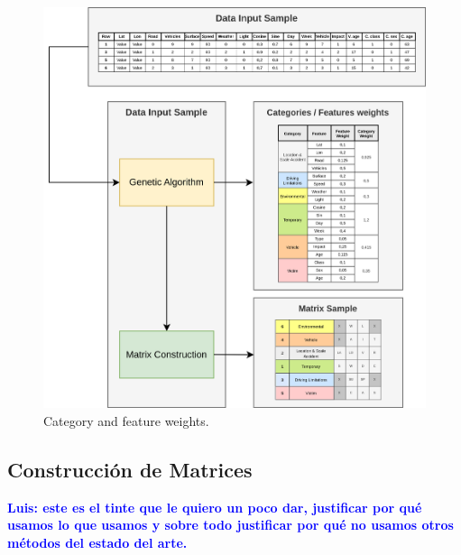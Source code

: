 \documentclass{uathesis-es}
\begin{document}
\begin{figure}[H]
    \centering
    \includegraphics[width=14cm]{Figures/Postprocessing_2.png}
    \caption{Category and feature weights.}
    \label{PostprocessingStage}
\end{figure}

\subsection{Construcción de Matrices}

\textcolor{blue}{\textbf{Luis: este es el tinte que le quiero un poco dar, justificar por qué usamos lo que usamos y sobre todo justificar por qué no usamos otros métodos del estado del arte.}}\\
\end{document}
